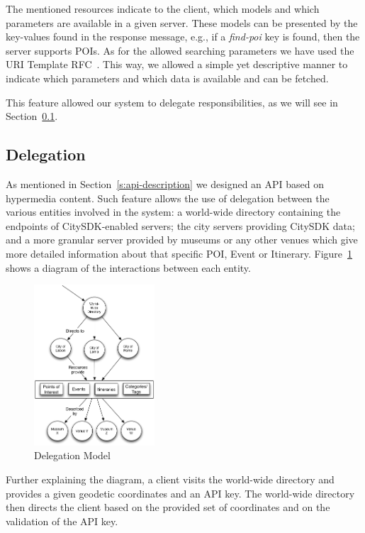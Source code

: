 \documentclass[times]{ettauth}
\begin{document}
The mentioned resources indicate to the client, which models and which parameters are available in a given server. These models can be presented by the key-values found in the response message, e.g., if a \textit{find-poi} key is found, then the server supports \acp{POI}. As for the allowed searching parameters we have used the URI Template RFC~\cite{uri-template}. This way, we allowed a simple yet descriptive manner to indicate which parameters and which data is available and can be fetched.

This feature allowed our system to delegate responsibilities, as we will see in Section~\ref{delegation}.

\subsection{Delegation}
\label{delegation}
As mentioned in Section~\ref{s:api-description} we designed an API based on hypermedia content. Such feature allows the use of delegation between the various entities involved in the system: a world-wide directory containing the endpoints of CitySDK-enabled servers; the city servers providing CitySDK data; and a more granular server provided by museums or any other venues which give more detailed information about that specific \ac{POI}, Event or Itinerary. Figure~\ref{fig:delegation} shows a diagram of the interactions between each entity.

\begin{figure}
\centering
\includegraphics[width=0.4\textwidth]{images/delegation}
\caption{Delegation Model}
\label{fig:delegation}
\end{figure}

Further explaining the diagram, a client visits the world-wide directory and provides a given geodetic coordinates and an API key. The world-wide directory then directs the client based on the provided set of  coordinates and on the validation of the API key.
\end{document}
